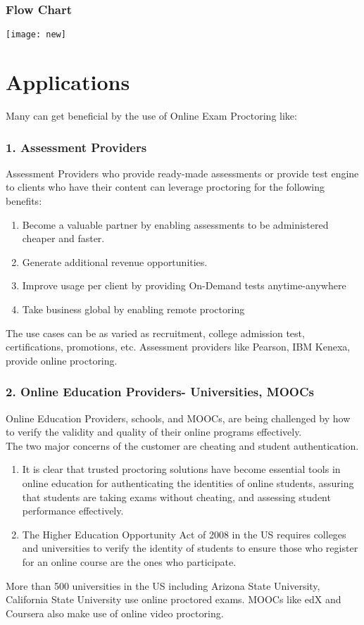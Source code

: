 \documentclass[12pt]{report}
\begin{document}
\subsubsection{Flow Chart}
\begin{center}
\texttt{[image: new]}
\end{center}
\newpage
\section{Applications}
Many can get beneficial by the use of Online Exam Proctoring like:
\subsubsection{1. Assessment Providers}
Assessment Providers who provide ready-made assessments or provide test engine to clients who have their content can leverage proctoring for the following benefits:
\begin{enumerate}
\item Become a valuable partner by enabling assessments to be administered cheaper and faster.
\item Generate additional revenue opportunities.
\item Improve usage per client by providing On-Demand tests anytime-anywhere
\item Take business global by enabling remote proctoring
\end{enumerate}
The use cases can be as varied as recruitment, college admission test, certifications, promotions, etc.
Assessment providers like Pearson, IBM Kenexa, provide online proctoring.
\subsubsection{2. Online Education Providers- Universities, MOOCs}
Online Education Providers, schools, and MOOCs, are being challenged by how to verify the validity and quality of their online programs effectively.\\
The two major concerns of the customer are cheating and student authentication.
\begin{enumerate}
\item It is clear that trusted proctoring solutions have become essential tools in online education for authenticating the identities of online students, assuring that students are taking exams without cheating, and assessing student performance effectively.
\item The Higher Education Opportunity Act of 2008 in the US requires colleges and universities to verify the identity of students to ensure those who register for an online course are the ones who participate.
\end{enumerate}
More than 500 universities in the US including Arizona State University, California State University use online proctored exams. MOOCs like edX and Coursera also make use of online video proctoring.
\end{document}
